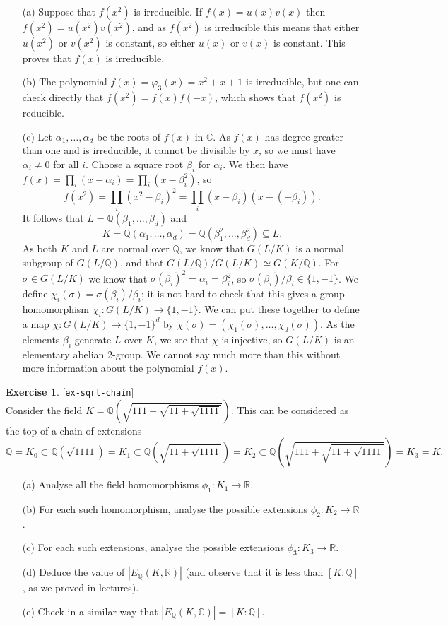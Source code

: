 \documentclass{amsart}
\newcommand{\Q}         {{\mathbb{Q}}}
\newcommand{\R}         {{\mathbb{R}}}
\newcommand{\C}         {{\mathbb{C}}}
\newcommand{\al}        {\alpha}
\newcommand{\bt}        {\beta}
\newcommand{\sg}        {\sigma}
\newcommand{\vph}       {\varphi}
\newcommand{\sse}       {\subseteq}
\renewcommand{\:}{\colon}
\newcommand{\lastexlabel}{}
\newcommand{\exlabel}[1]{
 \global\def\lastexlabel{#1}\label{#1}[\texttt{#1}]\ \\
}
\newcommand{\exlabel}[1]{
 \global\def\lastexlabel{#1}\label{#1}
}
\newenvironment{solution}{\SolutionInline}{\endSolutionInline}
\theoremstyle{definition}
\newtheorem{exercise}{Exercise}[section]
\renewenvironment{solution}{\SolutionAtEnd}{\endSolutionAtEnd}
\begin{document}
\begin{solution}\ \\
 \begin{itemize}
  \item[(a)] Suppose that $f(x^2)$ is irreducible.  If $f(x)=u(x)v(x)$
   then $f(x^2)=u(x^2)v(x^2)$, and as $f(x^2)$ is irreducible this
   means that either $u(x^2)$ or $v(x^2)$ is constant, so either
   $u(x)$ or $v(x)$ is constant.  This proves that $f(x)$ is
   irreducible.
  \item[(b)] The polynomial $f(x)=\vph_3(x)=x^2+x+1$ is irreducible,
   but one can check directly that $f(x^2)=f(x)f(-x)$, which shows
   that $f(x^2)$ is reducible.
  \item[(c)] Let $\al_1,\dotsc,\al_d$ be the roots of $f(x)$ in $\C$.
   As $f(x)$ has degree greater than one and is irreducible, it cannot
   be divisible by $x$, so we must have $\al_i\neq 0$ for all $i$.
   Choose a square root $\bt_i$ for $\al_i$.  We then have
   $f(x)=\prod_i(x-\al_i)=\prod_i(x-\bt_i^2)$, so
   \[ f(x^2) = \prod_i(x^2-\bt_i)^2 = \prod_i(x-\bt_i)(x-(-\bt_i)). \]
   It follows that $L=\Q(\bt_1,\dotsc,\bt_d)$ and 
   \[ K = \Q(\al_1,\dotsc,\al_d) =
       \Q(\bt_1^2,\dotsc,\bt_d^2) \sse L.
   \]
   As both $K$ and $L$ are normal over $\Q$, we know that $G(L/K)$ is
   a normal subgroup of $G(L/\Q)$, and that
   $G(L/\Q)/G(L/K)\simeq G(K/\Q)$.  For $\sg\in G(L/K)$ we know that
   $\sg(\bt_i)^2=\al_i=\bt_i^2$, so $\sg(\bt_i)/\bt_i\in\{1,-1\}$.  We
   define $\chi_i(\sg)=\sg(\bt_i)/\bt_i$; it is not hard to check that
   this gives a group homomorphism $\chi_i\:G(L/K)\to\{1,-1\}$.  We
   can put these together to define a map $\chi\:G(L/K)\to\{1,-1\}^d$
   by $\chi(\sg)=(\chi_1(\sg),\dotsc,\chi_d(\sg))$.  As the elements
   $\bt_i$ generate $L$ over $K$, we see that $\chi$ is injective,
   so $G(L/K)$ is an elementary abelian $2$-group.  We cannot say much
   more than this without more information about the polynomial
   $f(x)$.  
 \end{itemize}
\end{solution}
\begin{exercise}\exlabel{ex-sqrt-chain}
 Consider the field $K=\Q(\sqrt{111+\sqrt{11+\sqrt{1111}}})$.  This can
 be considered as the top of a chain of extensions 
 \[ \Q = K_0 \subset \Q(\sqrt{1111}) = K_1 \subset 
    \Q(\sqrt{11+\sqrt{1111}}) = K_2 \subset 
    \Q(\sqrt{111+\sqrt{11+\sqrt{1111}}}) = K_3 = K.
 \] 
 \begin{itemize}
  \item[(a)] Analyse all the field homomorphisms $\phi_1\:K_1\to\R$.
  \item[(b)] For each such homomorphism, analyse the possible
   extensions $\phi_2\:K_2\to\R$.
  \item[(c)] For each such extensions, analyse the possible
   extensions $\phi_3\:K_3\to\R$.
  \item[(d)] Deduce the value of $|E_\Q(K,\R)|$ (and observe that it
   is less than $[K:\Q]$, as we proved in lectures).
  \item[(e)] Check in a similar way that $|E_\Q(K,\C)|=[K:\Q]$.
 \end{itemize}
\end{exercise}
\end{document}
